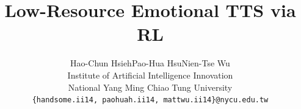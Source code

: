 \documentclass{article}
\title{Low-Resource Emotional TTS via RL}
\author{%
  Hao-Chun Hsieh\quad Pao-Hua Hsu\quad Nien-Tse Wu\\
  Institute of Artificial Intelligence Innovation\\
  National Yang Ming Chiao Tung University\\
  \texttt{\{handsome.ii14, paohuah.ii14, mattwu.ii14\}@nycu.edu.tw}
}
\begin{document}
\maketitle














\newpage
{
\small


}
\end{document}
